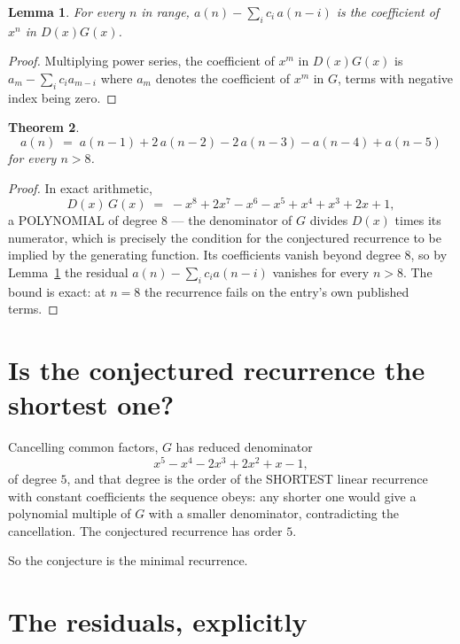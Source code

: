 \documentclass[11pt,a4paper]{article}
\theoremstyle{plain}
\newtheorem{theorem}{Theorem}
\newtheorem{lemma}[theorem]{Lemma}
\theoremstyle{definition}
\begin{document}
\begin{lemma}\label{lem:key}
For every $n$ in range, $a(n)-\sum_i c_i\,a(n-i)$ is the coefficient of $x^{n}$ in
$D(x)G(x)$.
\end{lemma}

\begin{proof}
Multiplying power series, the coefficient of $x^{m}$ in $D(x)G(x)$ is
$a_m-\sum_i c_i a_{m-i}$ where $a_m$ denotes the coefficient of $x^{m}$ in $G$, terms with
negative index being zero.
\end{proof}

\begin{theorem}
\[
a(n)\;=\;a(n-1) + 2\,a(n-2) - 2\,a(n-3) - a(n-4) + a(n-5)
\]
for every $n>8$.
\end{theorem}

\begin{proof}
In exact arithmetic,
\[
D(x)\,G(x)\;=\;- x^{8} + 2 x^{7} - x^{6} - x^{5} + x^{4} + x^{3} + 2 x + 1,
\]
a POLYNOMIAL of degree $8$ --- the denominator of $G$ divides $D(x)$ times its numerator,
which is precisely the condition for the conjectured recurrence to be implied by the
generating function. Its coefficients vanish beyond degree $8$, so by
Lemma~\ref{lem:key} the residual $a(n)-\sum_ic_ia(n-i)$ vanishes for every
$n>8$. The bound is exact: at $n=8$ the recurrence fails on the entry's own published terms.
\end{proof}

\section{Is the conjectured recurrence the shortest one?}

Cancelling common factors, $G$ has reduced denominator
\[
x^{5} - x^{4} - 2 x^{3} + 2 x^{2} + x - 1,
\]
of degree $5$, and that degree is the order of the SHORTEST linear recurrence with
constant coefficients the sequence obeys: any shorter one would give a polynomial multiple of
$G$ with a smaller denominator, contradicting the cancellation. The conjectured recurrence has
order $5$.

So the conjecture is the minimal recurrence.

\section{The residuals, explicitly}
\end{document}
